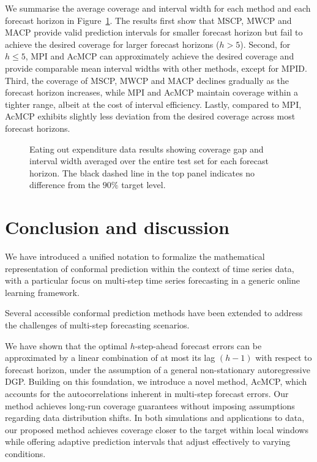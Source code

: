 \documentclass[
  11pt,
  12pt]{article}
\theoremstyle{plain}
\theoremstyle{remark}
\begin{document}
We summarise the average coverage and interval width for each method and
each forecast horizon in Figure~\ref{fig-cafe_cov}. The results first
show that MSCP, MWCP and MACP provide valid prediction intervals for
smaller forecast horizon but fail to achieve the desired coverage for
larger forecast horizons (\(h>5\)). Second, for \(h \leq 5\), MPI and
AcMCP can approximately achieve the desired coverage and provide
comparable mean interval widths with other methods, except for MPID.
Third, the coverage of MSCP, MWCP and MACP declines gradually as the
forecast horizon increases, while MPI and AcMCP maintain coverage within
a tighter range, albeit at the cost of interval efficiency. Lastly,
compared to MPI, AcMCP exhibits slightly less deviation from the desired
coverage across most forecast horizons.

\begin{figure}


\caption{\label{fig-cafe_cov}Eating out expenditure data results showing
coverage gap and interval width averaged over the entire test set for
each forecast horizon. The black dashed line in the top panel indicates
no difference from the \(90\%\) target level.}

\end{figure}%

\section{Conclusion and discussion}\label{conclusion-and-discussion}

We have introduced a unified notation to formalize the mathematical
representation of conformal prediction within the context of time series
data, with a particular focus on multi-step time series forecasting in a
generic online learning framework.

Several accessible conformal prediction methods have been extended to
address the challenges of multi-step forecasting scenarios.

We have shown that the optimal \(h\)-step-ahead forecast errors can be
approximated by a linear combination of at most its lag \((h-1)\) with
respect to forecast horizon, under the assumption of a general
non-stationary autoregressive DGP. Building on this foundation, we
introduce a novel method, AcMCP, which accounts for the autocorrelations
inherent in multi-step forecast errors. Our method achieves long-run
coverage guarantees without imposing assumptions regarding data
distribution shifts. In both simulations and applications to data, our
proposed method achieves coverage closer to the target within local
windows while offering adaptive prediction intervals that adjust
effectively to varying conditions.
\end{document}
